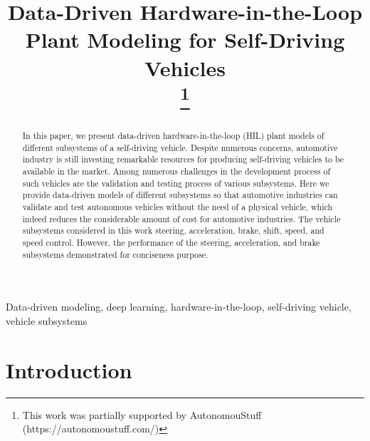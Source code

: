 \documentclass[conference]{IEEEtran}
\begin{document}
\title{Data-Driven Hardware-in-the-Loop Plant Modeling for Self-Driving Vehicles\\
\thanks{This work was partially supported by AutonomouStuff (https://autonomoustuff.com/)}
}


\author{
}

\maketitle

\begin{abstract}

  In this paper, we present data-driven hardware-in-the-loop (HIL) plant models of different subsystems of a self-driving vehicle. Despite numerous concerns, automotive industry is still investing remarkable resources for producing self-driving vehicles to be available in the market. Among numerous challenges in the development process of such vehicles are the validation and testing process of various subsystems. Here we provide data-driven models of different subsystems so that automotive industries can validate and test autonomous vehicles without the need of a physical vehicle, which indeed reduces the considerable amount of cost for automotive industries. The vehicle subsystems considered in this work steering, acceleration, brake, shift, speed, and speed control. However, the performance of the steering, acceleration, and brake subsystems demonstrated for conciseness purpose.

\end{abstract}

\begin{IEEEkeywords}
Data-driven modeling, deep learning, hardware-in-the-loop, self-driving vehicle, vehicle subsystems
\end{IEEEkeywords}

\section{Introduction}
\label{sec:introduction}

\end{document}
